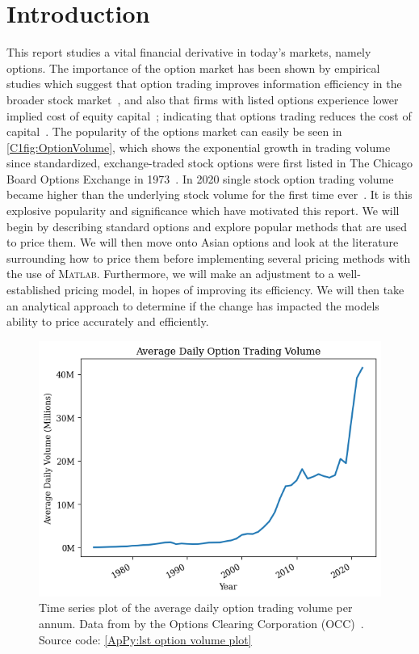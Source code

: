 \chapter{Introduction}
This report studies a vital financial derivative in today's markets, namely options. The importance of the option market has been shown by empirical studies which suggest that option trading improves information efficiency in the broader stock market~\cite{PanInfoEffic,li2021effect}, and also that firms with listed options experience lower implied cost of equity capital~\cite{naikerLowEquity}; indicating that options trading reduces the cost of capital~\cite{li2021effect}. The popularity of the options market can easily be seen in \autoref{C1fig:OptionVolume}, which shows the exponential growth in trading volume since standardized, exchange-traded stock options were first listed in The Chicago Board Options Exchange in 1973~\cite{markham2002financial}. In 2020 single stock option trading volume became higher than the underlying stock volume for the first time ever~\cite{yahooOptions}. 
\nline{}
It is this explosive popularity and significance which have motivated this report. We will begin by describing standard options and explore popular methods that are used to price them. We will then move onto Asian options and look at the literature surrounding how to price them before implementing several pricing methods with the use of \textsc{Matlab}. Furthermore, we will make an adjustment to a well-established pricing model, in hopes of improving its efficiency. We will then take an analytical approach to determine if the change has impacted the models ability to price accurately and efficiently.

\begin{figure}[H]
    \centering
    \includegraphics[width=\sOneSize\textwidth]{Chapters/C1/plots/OptionVolume.png}
    \caption{Time series plot of the average daily option trading volume per annum. Data from by the Options Clearing Corporation (OCC)~\cite{THEOCC}. Source code: \autoref{ApPy:lst option volume plot}}\label{C1fig:OptionVolume}\end{figure}

